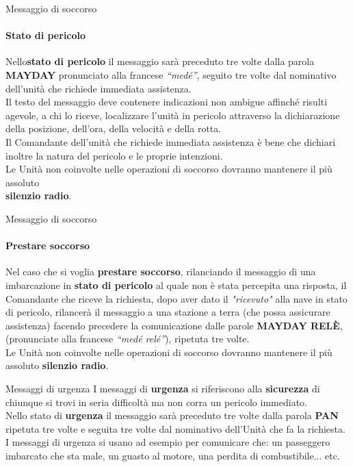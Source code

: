 \documentclass[aspectratio=169]{beamer}
\begin{document}
\begin{frame}{Messaggio di soccorso}
	\framesubtitle{Stato di pericolo}
	
	Nello\textbf{stato di pericolo} il messaggio sarà preceduto tre volte dalla parola \textbf{MAYDAY} pronunciato alla francese \emph{“medé”}, seguito tre volte dal nominativo dell'unità che richiede immediata assistenza.\\
	Il testo del messaggio deve contenere indicazioni non ambigue affinché risulti agevole, a chi lo riceve, localizzare l'unità in pericolo attraverso la dichiarazione della posizione, dell'ora, della velocità e della rotta.\\
	Il Comandante dell'unità che richiede immediata assistenza è bene che dichiari inoltre la natura del pericolo e le proprie intenzioni.\\
	\medskip
	{\textcolor{red!80}{Le Unità non coinvolte nelle operazioni di soccorso dovranno mantenere il più assoluto\\ \textbf{silenzio radio}.}}
\end{frame}


\begin{frame}{Messaggio di soccorso}
	\framesubtitle{Prestare soccorso}
	Nel caso che si voglia \textbf{prestare soccorso}, rilanciando il messaggio di una imbarcazione in \textbf{stato di pericolo} al quale non è stata percepita una risposta, il Comandante che riceve la richiesta, dopo aver dato il \emph{"ricevuto"} alla nave in stato di pericolo, rilancerà il messaggio a una stazione a terra (che possa assicurare assistenza)  facendo precedere la comunicazione dalle parole \textbf{MAYDAY RELÈ}, (pronunciate alla francese \emph{“medé relé”}), ripetuta tre volte.\\
	\medskip
	{\textcolor{red!80}{Le Unità non coinvolte nelle operazioni di soccorso dovranno mantenere il più assoluto \textbf{silenzio radio}.}}
\end{frame}

\begin{frame}{Messaggi di urgenza}
	I messaggi di \textbf{urgenza} si riferiscono alla \textbf{sicurezza} di chiunque si trovi in seria difficoltà ma non corra un pericolo immediato.\\
	\smallskip
	Nello stato di \textbf{urgenza} il messaggio sarà preceduto tre volte dalla parola \textbf{PAN} ripetuta tre volte e seguita tre volte dal nominativo dell'Unità che fa la richiesta.\\
	\medskip
	I messaggi di urgenza si usano ad esempio per comunicare che: un passeggero imbarcato che sta male, un guasto al motore, una perdita di combustibile... etc.
\end{frame}
\end{document}
